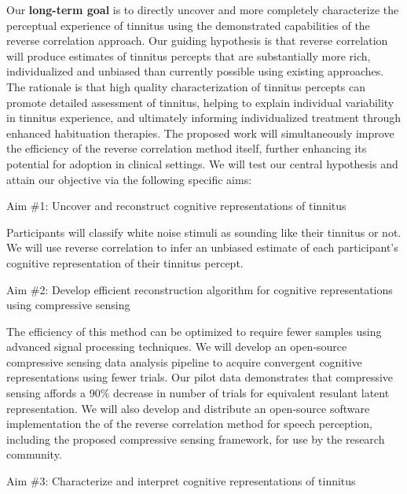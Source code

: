 \documentclass[11pt, notitlepage]{article} %
\begin{document}
Our \textbf{long-term goal} is to directly uncover and more completely characterize the perceptual experience of tinnitus using the demonstrated capabilities of the reverse correlation approach.
Our guiding hypothesis is that reverse correlation will produce estimates of tinnitus percepts that are substantially more rich, individualized and unbiased than currently possible using existing approaches. The rationale is that high quality characterization of tinnitus percepts can promote detailed assessment of tinnitus, helping to explain individual variability in tinnitus experience, and ultimately informing individualized treatment through enhanced habituation therapies. The proposed work will simultaneously improve the efficiency of the reverse correlation method itself, further enhancing its potential for adoption in clinical settings. We will test our central hypothesis and attain our objective via the following specific aims:

\begin{description}
	\item[Aim \#1: Uncover and reconstruct cognitive representations of tinnitus]{} 
\end{description}

Participants will classify white noise stimuli as sounding like their tinnitus or not.
We will use reverse correlation to infer an unbiased estimate of each participant's cognitive representation of their tinnitus percept. 

\begin{description}
	\item[Aim \#2: Develop efficient reconstruction algorithm for cognitive representations using compressive sensing]{} 
\end{description}

The efficiency of this method can be optimized to require fewer samples using advanced signal processing techniques.
We will develop an open-source compressive sensing data analysis pipeline to acquire convergent cognitive representations using fewer trials.
Our pilot data demonstrates that compressive sensing affords a 90\% decrease in number of trials for equivalent resulant latent representation.
We will also develop and distribute an open-source software implementation the of the reverse correlation method for speech perception,
including the proposed compressive sensing framework, for use by the research community.

\begin{description}
	\item[Aim \#3: Characterize and interpret cognitive representations of tinnitus]{} 
\end{description}
\end{document}
